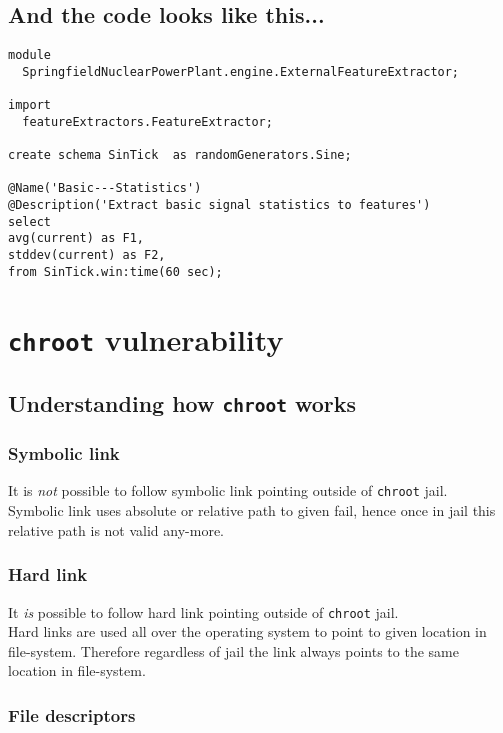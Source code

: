 \documentclass[12pt, a4paper, pdflatex]{article}
\begin{document}
\subsection{And the code looks like this...}
\vspace{1em}
\begin{lstlisting}
module
  SpringfieldNuclearPowerPlant.engine.ExternalFeatureExtractor;

import
  featureExtractors.FeatureExtractor;

create schema SinTick  as randomGenerators.Sine;

@Name('Basic---Statistics')
@Description('Extract basic signal statistics to features')
select
avg(current) as F1,
stddev(current) as F2,
from SinTick.win:time(60 sec);
\end{lstlisting}


\section{\texttt{chroot} vulnerability}
\subsection{Understanding how \texttt{chroot} works}
\subsubsection{Symbolic link}
It is \emph{not} possible to follow symbolic link pointing outside of \texttt{chroot} jail.\\
Symbolic link uses absolute or relative path to given fail, hence once in jail this relative path is not valid any-more.

\subsubsection{Hard link}
It \emph{is} possible to follow hard link pointing outside of \texttt{chroot} jail.\\
Hard links are used all over the operating system to point to given location in file-system. Therefore regardless of jail the link always points to the same location in file-system.

\subsubsection{File descriptors}
\end{document}
